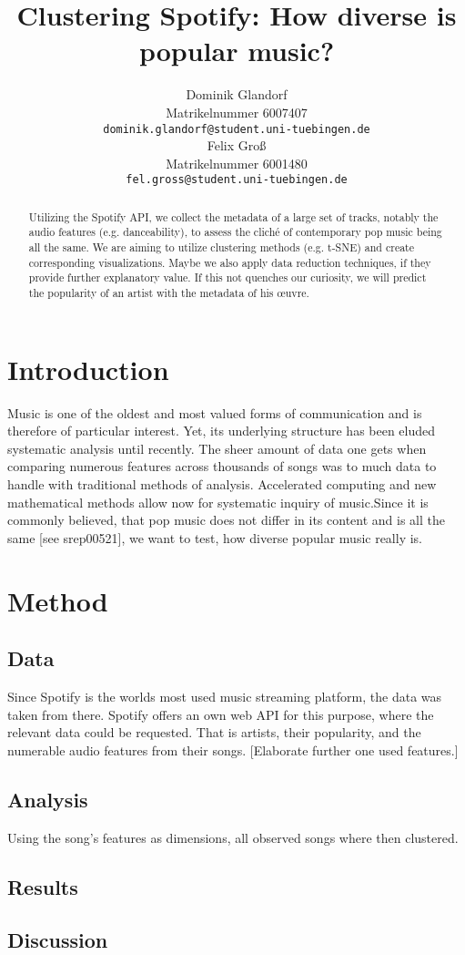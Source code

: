 \documentclass{article}
\title{Clustering Spotify: How diverse is popular music?}
\author{%
  Dominik Glandorf\\
  Matrikelnummer 6007407\\
  \texttt{dominik.glandorf@student.uni-tuebingen.de} \\
  \And
  Felix Groß\\
  Matrikelnummer 6001480\\
  \texttt{fel.gross@student.uni-tuebingen.de} \\
}
\begin{document}
\maketitle

\begin{abstract}
{Utilizing the Spotify API, we collect the metadata of a large set of tracks, notably the audio features (e.g. danceability), to assess the cliché of contemporary pop music being all the same.  
  We are aiming to utilize clustering methods (e.g. t-SNE) and create corresponding visualizations. Maybe we also apply data reduction techniques, if they provide further explanatory value. If this not quenches our curiosity, we will predict the popularity of an artist with the metadata of his œuvre.}
\end{abstract}

\section{Introduction}

Music is one of the oldest and most valued forms of communication and is therefore of particular interest. Yet, its underlying structure has been eluded systematic analysis until recently. The sheer amount of data one gets when comparing numerous features across thousands of songs was to much data to handle with traditional methods of analysis. Accelerated computing and new mathematical methods allow now for systematic inquiry of music.\newline Since it is commonly believed, that pop music does not differ in its content and is all the same [see srep00521], we want  to test, how diverse popular music really is. 

\section{Method}

\subsection{Data}
Since Spotify is the worlds most used music streaming platform, the data was taken from there. Spotify offers an own web API for this purpose, where the relevant data could be requested. That is artists, their popularity, and the numerable audio features from their songs. 
[Elaborate further one used features.]

\subsection{Analysis}
Using the song's features as dimensions, all observed songs where then clustered. 

\subsection{Results}

\subsection{Discussion}
\end{document}

